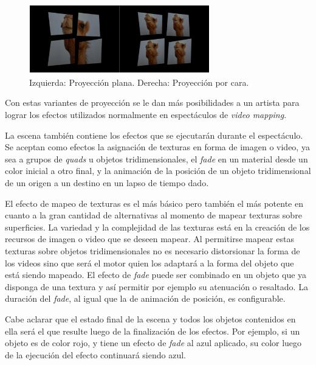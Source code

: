 \begin{figure}[H]
  \centering
    \includegraphics[width=0.7\textwidth]{./Cap5_vmt/vmtengine-maping.png}
  \caption{Izquierda: Proyección plana. Derecha: Proyección por cara.}%
  \label{fig:VMT-Projection}
\end{figure}

Con estas variantes de proyección se le dan más posibilidades a un artista para lograr los efectos utilizados normalmente en espectáculos de \emph{video mapping}.

La escena también contiene los efectos que se ejecutarán durante el espectáculo. Se aceptan como efectos la asignación de texturas en forma de imagen o video, ya sea a grupos de \emph{quads} u objetos tridimensionales, el \emph{fade} en un material desde un color inicial a otro final, y la animación de la posición de un objeto tridimensional de un origen a un destino en un lapso de tiempo dado.

El efecto de mapeo de texturas es el más básico pero también el más potente en cuanto a la gran cantidad de alternativas al momento de mapear texturas sobre superficies. La variedad y la complejidad de las texturas está en la creación de los recursos de imagen o video que se deseen mapear. Al permitirse mapear estas texturas sobre objetos tridimensionales no es necesario distorsionar la forma de los videos sino que será el motor quien los adaptará a la forma del objeto que está siendo mapeado. El efecto de \emph{fade} puede ser combinado en un objeto que ya disponga de una textura y así permitir por ejemplo su atenuación o resaltado. La duración del \emph{fade}, al igual que la de animación de posición, es configurable.

Cabe aclarar que el estado final de la escena y todos los objetos contenidos en ella será el que resulte luego de la finalización de los efectos. Por ejemplo, si un objeto es de color rojo, y tiene un efecto de \emph{fade} al azul aplicado, su color luego de la ejecución del efecto continuará siendo azul.

